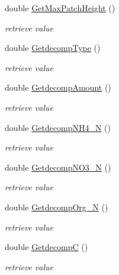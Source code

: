 \begin{DoxyCompactItemize}
double \hyperlink{classpatch_interface_class_aaf06ccc28f2da0305c55612a1014a7a7}{GetMaxPatchHeight} ()
\begin{DoxyCompactList}\small\item\em retrieve value \item\end{DoxyCompactList}\item 
double \hyperlink{classpatch_interface_class_a1c3b47083e9d253938866de196e4a32f}{GetdecompType} ()
\begin{DoxyCompactList}\small\item\em retrieve value \item\end{DoxyCompactList}\item 
double \hyperlink{classpatch_interface_class_acf19842fe4f4e22afeef2f9311f80844}{GetdecompAmount} ()
\begin{DoxyCompactList}\small\item\em retrieve value \item\end{DoxyCompactList}\item 
double \hyperlink{classpatch_interface_class_aa50f7e747e12b3b2aceff2ceacbf0fd6}{GetdecompNH4\_\-N} ()
\begin{DoxyCompactList}\small\item\em retrieve value \item\end{DoxyCompactList}\item 
double \hyperlink{classpatch_interface_class_a004f7335353f2dee7762fd7b6eb70d94}{GetdecompNO3\_\-N} ()
\begin{DoxyCompactList}\small\item\em retrieve value \item\end{DoxyCompactList}\item 
double \hyperlink{classpatch_interface_class_a3a675bc14d9ac52b29a852209b591c5f}{GetdecompOrg\_\-N} ()
\begin{DoxyCompactList}\small\item\em retrieve value \item\end{DoxyCompactList}\item 
double \hyperlink{classpatch_interface_class_a77ece4c3fefc61b3582f209a6972e145}{GetdecompC} ()
\begin{DoxyCompactList}\small\item\em retrieve value \item\end{DoxyCompactList}\item 

\end{DoxyCompactItemize}
